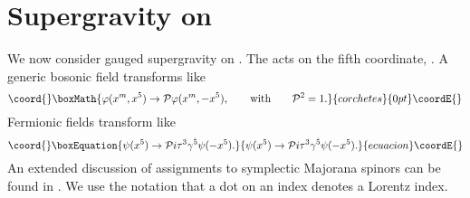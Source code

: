 \documentclass[a4paper,12pt, twoside]{article}
\numberwithin{equation}{section}
\begin{document}
\section{Supergravity on \coordHE{}}\label{sgs}
We now consider gauged supergravity on \coordHE{}. The 
\coordHE{} acts on the fifth coordinate, \coordHE{}. A generic bosonic 
field transforms like
\[\coord{}\boxMath{
\varphi(x^m,x^5)\to{\cal P}\varphi(x^m,-x^5),\qquad \mbox{with}\qquad 
{\cal P}^2=1.
}{corchetes}{0pt}\coordE{}\]
Fermionic fields transform like
\begin{equation}\coord{}\boxEquation{
\psi(x^5)\to {\cal P}i\tau^3\gamma^{\dot{5}}\psi(-x^5).\label{proj}
}{
\psi(x^5)\to {\cal P}i\tau^3\gamma^{\dot{5}}\psi(-x^5).}{ecuacion}\coordE{}\end{equation}
An extended discussion of \coordHE{} assignments to symplectic 
Majorana spinors can be found in \cite{Bergshoeff:2000zn}. We use the 
notation that a dot on an index \coordHE{} denotes a Lorentz index.
\end{document}
